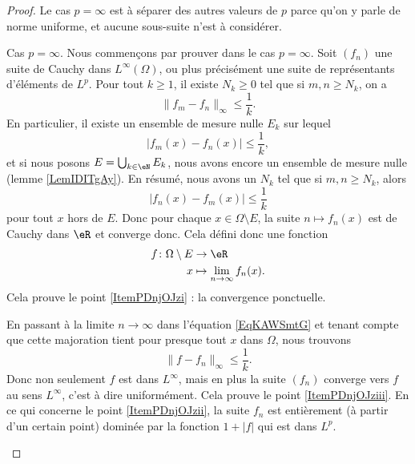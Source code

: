 \begin{proof}
    Le cas \( p=\infty\) est à séparer des autres valeurs de \( p\) parce qu'on y parle de norme uniforme, et aucune sous-suite n'est à considérer.
    \begin{subproof}
    \item[Cas \( p=\infty\).]
    Nous commençons par prouver dans le cas \( p=\infty\). Soit \( (f_n)\) une suite de Cauchy dans \( L^{\infty}(\Omega)\), ou plus précisément une suite de représentants d'éléments de \( L^p\). Pour tout \( k\geq 1\), il existe \( N_k\geq 0\) tel que si \( m,n\geq N_k\), on a
    \begin{equation}
        \| f_m-f_n \|_{\infty}\leq \frac{1}{ k }.
    \end{equation}
    En particulier, il existe un ensemble de mesure nulle \( E_k\) sur lequel
    \begin{equation}
        | f_m(x)-f_n(x) |\leq\frac{1}{ k },
    \end{equation}
    et si nous posons \( E=\bigcup_{k\in \eN}E_k\), nous avons encore un ensemble de mesure nulle (lemme \ref{LemIDITgAy}). En  résumé, nous avons un \( N_k\) tel que si \( m,n\geq N_k\), alors 
    \begin{equation}    \label{EqKAWSmtG}
        | f_n(x)-f_m(x) |\leq \frac{1}{ k }
    \end{equation}
    pour tout \( x\) hors de \( E\). Donc pour chaque \( x\in\Omega\setminus E\), la suite \( n\mapsto f_n(x)\) est de Cauchy dans \( \eR\) et converge donc. Cela défini donc une fonction
    \begin{equation}
        \begin{aligned}
            f\colon \Omega\setminus E&\to \eR \\
            x&\mapsto \lim_{n\to \infty} f_n(x). 
        \end{aligned}
    \end{equation}
    Cela prouve le point \ref{ItemPDnjOJzi} : la convergence ponctuelle.

    En passant à la limite \( n\to \infty\) dans l'équation \ref{EqKAWSmtG} et tenant compte que cette majoration tient pour presque tout \( x\) dans \( \Omega\), nous trouvons
    \begin{equation}
        \| f-f_n \|_{\infty}\leq \frac{1}{ k }.
    \end{equation}
    Donc non seulement \( f\) est dans \( L^{\infty}\), mais en plus la suite \( (f_n)\) converge vers \( f\) au sens \( L^{\infty}\), c'est à dire uniformément. Cela prouve le point \ref{ItemPDnjOJziii}. En ce qui concerne le point \ref{ItemPDnjOJzii}, la suite \( f_n\) est entièrement (à partir d'un certain point) dominée par la fonction \( 1+| f |\) qui est dans \( L^p\).



\end{subproof}
\end{proof}
